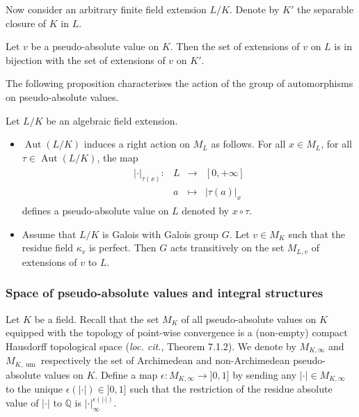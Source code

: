 \documentclass [11pt,reqno]{amsart}
\def\bQ{{\mathbb{Q}}}
\newcommand{\1}{\mathmybb{1}}
\def\Aut{\operatorname{Aut}}
\def\um{\operatorname{um}}
\newcommand{\va}{|\cdot|}
\newcommand{\fonction}[5]{\begin{array}{l|rcl}
#1: & #2 & \longrightarrow & #3 \\
    & #4 & \longmapsto & #5 \end{array}}
\begin{document}
Now consider an arbitrary finite field extension $L/K$. Denote by $K'$ the separable closure of $K$ in $L$. 

\begin{proposition}
\label{cor:purely_inseparable_extension_sav}
Let $v$ be a pseudo-absolute value on $K$. Then the set of extensions of $v$ on $L$ is in bijection with the set of extensions of $v$ on $K'$.
\end{proposition}

The following proposition characterises the action of the group of automorphisms on pseudo-absolute values.

\begin{proposition}
\label{prop:action_Galois}
Let $L/K$ be an algebraic field extension. 
\begin{itemize}
	\item[(1)] $\Aut(L/K)$ induces a right action on $M_L$ as follows. For all $x \in M_L$, for all $\tau \in \Aut(L/K)$, the map
\begin{align*}
\fonction{\va_{\tau(x)}}{L}{[0,+\infty]}{a}{|\tau(a)|_{x}}
\end{align*}
defines a pseudo-absolute value on $L$ denoted by $x\circ \tau$. 
	\item[(2)] Assume that $L/K$ is Galois with Galois group $G$. Let $v\in M_K$ such that the residue field $\kappa_v$ is perfect. Then $G$ acts transitively on the set $M_{L,v}$ of extensions of $v$ to $L$.  
\end{itemize}
\end{proposition} 
 

\subsubsection{Space of pseudo-absolute values and integral structures}
\label{subsub:prelim_integral_structures}
Let $K$ be a field. Recall that the set $M_{K}$ of all pseudo-absolute values on $K$ equipped with the topology of point-wise convergence is a (non-empty) compact Hausdorff topological space (\emph{loc. cit.}, Theorem 7.1.2). We denote by $M_{K,\infty}$ and $M_{K,\um}$ respectively the set of Archimedean and non-Archimedean pseudo-absolute values on $K$. Define a map $\epsilon : M_{K,\infty} \to ]0,1]$ by sending any $|\cdot|\in M_{K,\infty}$ to the unique $\epsilon(|\cdot|)\in]0,1]$ such that the restriction of the residue absolute value of $|\cdot|$ to $\bQ$ is $|\cdot|_{\infty}^{\epsilon(|\cdot|)}$.
\end{document}

